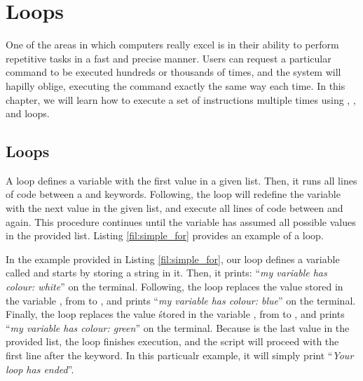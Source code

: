 \chapter{Loops}\label{ch:loops}

One of the areas in which computers really excel is in their ability to perform repetitive tasks in a fast and precise manner. Users can request a particular command to be executed hundreds or thousands of times, and the system will hapilly oblige, executing the command exactly the same way each time. In this chapter, we will learn how to execute a set of instructions multiple times using , , and  loops. 

\section{ Loops}

A  loop defines a variable with the first value in a given list. Then,  it runs all lines of code between a  and  keywords. Following, the loop will redefine the variable with the next value in the given list, and execute all lines of code between  and  again. This procedure continues until the variable has assumed all possible values in the provided list. Listing \ref{fil:simple_for} provides an example of a  loop.


In the example provided in Listing \ref{fil:simple_for}, our loop defines a variable called  and starts by storing a string  in it. Then, it prints: ``\textit{my variable has colour: white}'' on the terminal. Following, the loop replaces the value stored in the variable , from  to , and prints ``\textit{my variable has colour: blue}'' on the terminal. Finally, the loop replaces the value śtored in the variable , from  to , and prints ``\textit{my variable has colour: green}'' on the terminal. Because  is the last value in the provided list, the loop finishes execution, and the script will proceed with the first line after the  keyword. In this particualr example, it will simply print ``\textit{Your loop has ended}''.

